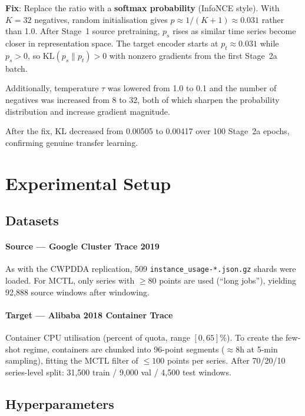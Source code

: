 \documentclass[12pt,a4paper]{article}
\begin{document}
\textbf{Fix}: Replace the ratio with a \textbf{softmax probability} (InfoNCE style).
With $K = 32$ negatives, random initialisation gives
$p \approx 1/(K+1) \approx 0.031$ rather than 1.0.
After Stage~1 source pretraining, $p_s$ rises as similar time series become
closer in representation space.  The target encoder starts at $p_t \approx 0.031$
while $p_s > 0$, so $\text{KL}(p_s \| p_t) > 0$ with nonzero gradients
from the first Stage~2a batch.

Additionally, temperature $\tau$ was lowered from 1.0 to 0.1 and the number
of negatives was increased from 8 to 32, both of which sharpen the probability
distribution and increase gradient magnitude.

After the fix, KL decreased from 0.00505 to 0.00417 over 100 Stage~2a epochs,
confirming genuine transfer learning.

\section{Experimental Setup}

\subsection{Datasets}

\paragraph{Source — Google Cluster Trace 2019}
As with the CWPDDA replication, 509 \texttt{instance\_usage-*.json.gz} shards
were loaded. For MCTL, only series with $\geq 80$ points are used (``long jobs''),
yielding 92,888 source windows after windowing.

\paragraph{Target — Alibaba 2018 Container Trace}
Container CPU utilisation (percent of quota, range $[0, 65]$\%).
To create the few-shot regime, containers are chunked into 96-point segments
($\approx$8h at 5-min sampling), fitting the MCTL filter of $\leq 100$
points per series.  After 70/20/10 series-level split: 31,500 train /
9,000 val / 4,500 test windows.

\subsection{Hyperparameters}
\end{document}
